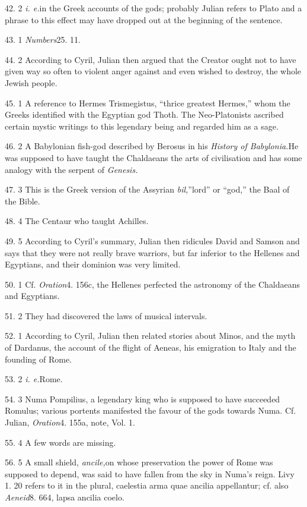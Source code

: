 42. 2 \emph{i. e.}in the Greek accounts of the gods; probably Julian refers to Plato and a phrase to this effect may have dropped out at the beginning of the sentence.

43. 1 \emph{Numbers}25. 11.

44. 2 According to Cyril, Julian then argued that the Creator ought not to have given way so often to violent anger against and even wished to destroy, the whole Jewish people.

45. 1 A reference to Hermes Trismegistus, ``thrice greatest Hermes,'' whom the Greeks identified with the Egyptian god Thoth. The Neo-Platonists ascribed certain mystic writings to this legendary being and regarded him as a sage.

46. 2 A Babylonian fish-god described by Berosus in his \emph{History of Babylonia.}He was supposed to have taught the Chaldaeans the arts of civilisation and has some analogy with the serpent of \emph{Genesis.}

47. 3 This is the Greek version of the Assyrian \emph{bil,}''lord'' or ``god,'' the Baal of the Bible.

48. 4 The Centaur who taught Achilles.

49. 5 According to Cyril's summary, Julian then ridicules David and Samson and says that they were not really brave warriors, but far inferior to the Hellenes and Egyptians, and their dominion was very limited.

50. 1 Cf. \emph{Oration}4. 156c, the Hellenes perfected the astronomy of the Chaldaeans and Egyptians.

51. 2 They had discovered the laws of musical intervals.

52. 1 According to Cyril, Julian then related stories about Minos, and the myth of Dardanus, the account of the flight of Aeneas, his emigration to Italy and the founding of Rome.

53. 2 \emph{i. e.}Rome.

54. 3 Numa Pompilius, a legendary king who is supposed to have succeeded Romulus; various portents manifested the favour of the gods towards Numa. Cf. Julian, \emph{Oration}4. 155a, note, Vol. 1.

55. 4 A few words are missing.

56. 5 A small shield, \emph{ancile,}on whose preservation the power of Rome was supposed to depend, was said to have fallen from the sky in Numa's reign. Livy 1. 20 refers to it in the plural, caelestia arma quae ancilia appellantur; cf. also \emph{Aeneid}8. 664, lapsa ancilia coelo.

